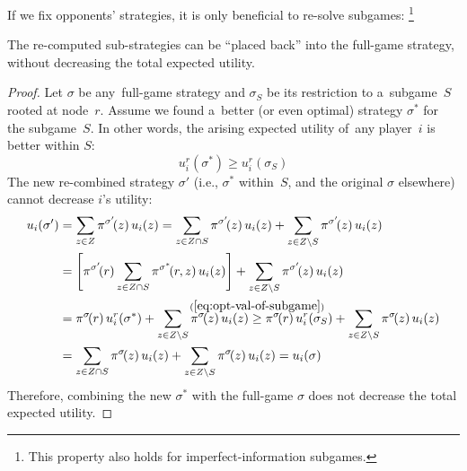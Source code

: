If we fix opponents' strategies, it is only beneficial to re-solve subgames:%
\footnote{This property also holds for imperfect-information subgames.}
\begin{thm}
  \label{thm:perf-info-subgames-utility}
  The re-computed sub-strategies can be ``placed back'' into the full-game strategy, without decreasing the total expected utility.
\end{thm}
\begin{proof}
  Let $\sigma$ be any~full-game strategy and $\sigma_S$ be its restriction to a~subgame~$S$ rooted at node~$r$.
  Assume we found a~better (or even optimal) strategy $\sigma^*$ for the subgame~$S$.
  In other words, the arising expected utility of~any player~$i$ is better within $S$:
  \begin{equation}
    \label{eq:opt-val-of-subgame}
    u_i^r(\sigma^*) \ge u_i^r(\sigma_S)
  \end{equation}
  The new re-combined strategy $\sigma'$ (i.e., $\sigma^*$ within~$S$, and the original $\sigma$ elsewhere) cannot decrease $i$'s utility:
  \begin{align*}
    u_i(\sigma')
    &= \sum _{z \in Z} \pi^{\sigma'}\!(z) \,u_i(z)
    = \sum _{z \in Z \cap S} \pi^{\sigma'}\!(z) \,u_i(z)
    + \sum _{z \in Z \setminus S} \pi^{\sigma'}\!(z) \,u_i(z) \\
    &= \left[ \pi^{\sigma'}\!(r)\sum _{z \in Z \cap S} \pi^{\sigma^*}\!(r, z) \,u_i(z) \right]
    + \sum _{z \in Z \setminus S} \pi^{\sigma'}\!(z) \,u_i(z) \\
    &= \pi^{\sigma}\!(r) \,u_i^r(\sigma^*)
    + \sum _{z \in Z \setminus S} \pi^{\sigma}\!(z) \,u_i(z)
    \stackrel{\mathclap{\mathrm{(\ref{eq:opt-val-of-subgame})}}} {\ge}
    \pi^{\sigma}\!(r) \,u_i^r(\sigma_S)
    + \sum _{z \in Z \setminus S} \pi^{\sigma}\!(z) \,u_i(z) \\
    &= \sum _{z \in Z \cap S} \pi^{\sigma}\!(z) \,u_i(z)
    + \sum _{z \in Z \setminus S} \pi^{\sigma}\!(z) \,u_i(z)
    = u_i(\sigma)
  \end{align*}
  Therefore, combining the new $\sigma^*$ with the full-game $\sigma$ does not decrease the total expected utility.
\end{proof}

